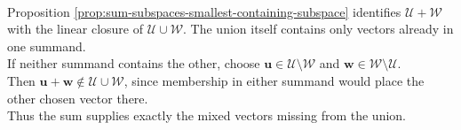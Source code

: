 \begin{perspective} \label{per:sum-not-union} \\
Proposition \ref{prop:sum-subspaces-smallest-containing-subspace} identifies $\mathcal{U}+\mathcal{W}$ with the linear closure of $\mathcal{U}\cup\mathcal{W}$. The union itself contains only vectors already in one summand.\\
If neither summand contains the other, choose $\mathbf{u}\in\mathcal{U}\setminus\mathcal{W}$ and $\mathbf{w}\in\mathcal{W}\setminus\mathcal{U}$.\\
Then $\mathbf{u}+\mathbf{w}\notin\mathcal{U}\cup\mathcal{W}$, since membership in either summand would place the other chosen vector there.\\
Thus the sum supplies exactly the mixed vectors missing from the union.
\end{perspective}

